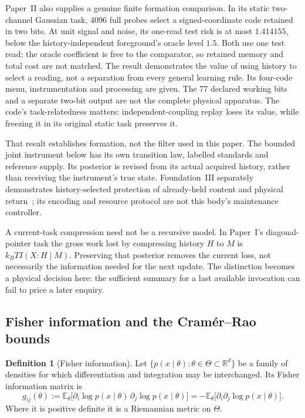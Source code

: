 \documentclass[12pt]{article}
\theoremstyle{definition}
\newtheorem{definition}[theorem]{Definition}
\newcommand{\E}{\mathbb E}
\begin{document}
Paper~II also supplies a genuine finite formation comparison.
In its static two-channel Gaussian task, 4096 full probes select a
signed-coordinate code retained in two bits.
At unit signal and noise, its one-read test risk is at most
$1.414155$, below the history-independent foreground's oracle level
$1.5$. Both use one test read; the oracle coefficient is free to the
comparator, so retained memory and total cost are not matched. The
result demonstrates the value of using history to select a reading,
not a separation from every general learning rule.
Its four-code menu, instrumentation and processing are given.
The 77 declared working bits and a separate two-bit output are not
the complete physical apparatus.
The code's task-relatedness matters: independent-coupling replay
loses its value, while freezing it in its original static task
preserves it.

That result establishes formation, not the filter used in this paper.
The bounded joint instrument below has its own transition law,
labelled standards and reference supply. Its posterior is revised
from its actual acquired history, rather than receiving the
instrument's true state.
Foundation~III separately demonstrates history-selected protection
of already-held content and physical return~\cite{Liu2026FIII};
its encoding and resource protocol are not this body's maintenance
controller.

A current-task compression need not be a recursive model.
In Paper~I's diagonal-pointer task the gross work lost by compressing
history $H$ to $M$ is $k_BT I(X:H\mid M)$.
Preserving that posterior removes the current loss, not necessarily
the information needed for the next update.
The distinction becomes a physical decision here: the sufficient
summary for a last available invocation can fail to price a later
enquiry.

\subsection{Fisher information and the Cram\'er--Rao bounds}
\label{subsec:fisher}

\begin{definition}[Fisher information]
\label{def:fisher}
Let $\{p(x\mid\theta):\theta\in\Theta\subset\mathbb R^d\}$ be a family of densities for which differentiation and integration may be interchanged. Its Fisher information matrix is
\begin{equation}
\label{eq:fisher_def}
g_{ij}(\theta)
:=\E_\theta\bigl[\partial_i\log p(x\mid\theta)\,\partial_j\log p(x\mid\theta)\bigr]
=-\E_\theta\bigl[\partial_i\partial_j\log p(x\mid\theta)\bigr].
\end{equation}
Where it is positive definite it is a Riemannian metric on $\Theta$.
\end{definition}
\end{document}

